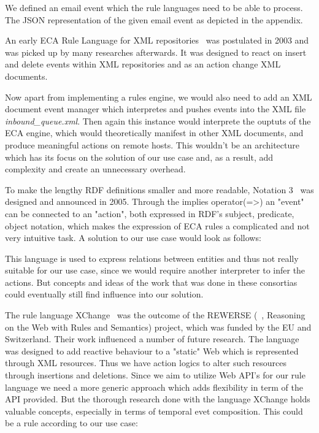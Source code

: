 We defined an email event which the rule languages need to be able to process.
The JSON representation of the given email event as depicted in the appendix. %


An early ECA Rule Language for XML repositories~\cite{Papamarkos03event-condition-actionrule} was postulated in 2003 and was picked up by many researches afterwards. It was designed to react on insert and delete events within XML repositories and as an action change XML documents.


Now apart from implementing a rules engine, we would also need to add an XML document event manager which interpretes and pushes events into the XML file \emph{inbound\_queue.xml}. Then again this instance would interprete the ouptuts of the ECA engine, which would theoretically manifest in other XML documents, and produce meaningful actions on remote hosts. This wouldn't be an architecture which has its focus on the solution of our use case and, as a result, add complexity and create an unnecessary overhead.

To make the lengthy RDF definitions smaller and more readable, Notation 3~\cite{berners2006notation} was designed and announced in 2005. Through the implies operator(=\textgreater) an "event" can be connected to an "action", both expressed in RDF's subject, predicate, object notation, which makes the expression of ECA rules a complicated and not very intuitive task. A solution to our use case would look as follows:

This language is used to express relations between entities and thus not really suitable for our use case, since we would require another interpreter to infer the actions. But concepts and ideas of the work that was done in these consortias could eventually still find influence into our solution.

The rule language XChange~\cite{2005-Patranjan-TLE.pdf} was the outcome of the REWERSE (~\cite{wwwRewerse}, Reasoning on the Web with Rules and Semantics) project, which was funded by the EU and Switzerland. Their work influenced a number of future research. The language was designed to add reactive behaviour to a "static" Web which is represented through XML resources. Thus we have action logics to alter such resources through insertions and deletions. Since we aim to utilize Web API's for our rule language we need a more generic approach which adds flexibility in term of the API provided. But the thorough research done with the language XChange holds valuable concepts, especially in terms of temporal evet composition. This could be a rule according to our use case:


